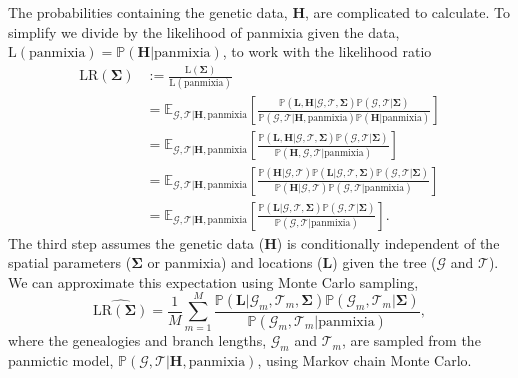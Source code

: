 \documentclass[12pt]{article}
\begin{document}
The probabilities containing the genetic data, $\mathbf{H}$, are complicated to calculate. 
To simplify we divide by the likelihood of panmixia given the data, $\mathrm{L}(\mathrm{panmixia}) = \mathbb{P}(\mathbf{H}|\mathrm{panmixia})$, to work with the likelihood ratio
%
\begin{equation}
\begin{aligned}
\mathrm{LR}(\mathbf{\Sigma}) &:= \frac{\mathrm{L}(\mathbf{\Sigma})}{\mathrm{L}(\mathrm{panmixia})}\\
&= \mathbb{E}_{\mathcal{G}, \mathcal{T} | \mathbf{H}, \mathrm{panmixia}} \left[ \frac{\mathbb{P}(\mathbf{L}, \mathbf{H} | \mathcal{G}, \mathcal{T},\mathbf{\Sigma}) \mathbb{P}(\mathcal{G}, \mathcal{T} | \mathbf{\Sigma})}{\mathbb{P}(\mathcal{G}, \mathcal{T} | \mathbf{H}, \mathrm{panmixia}) \mathbb{P}(\mathbf{H} | \mathrm{panmixia})} \right] \\
&= \mathbb{E}_{\mathcal{G}, \mathcal{T} | \mathbf{H}, \mathrm{panmixia}} \left[ \frac{\mathbb{P}(\mathbf{L},\mathbf{H} | \mathcal{G}, \mathcal{T},\mathbf{\Sigma}) \mathbb{P}(\mathcal{G}, \mathcal{T} | \mathbf{\Sigma})}{\mathbb{P}(\mathbf{H}, \mathcal{G}, \mathcal{T} | \mathrm{panmixia})} \right] \\
&= \mathbb{E}_{\mathcal{G}, \mathcal{T} | \mathbf{H}, \mathrm{panmixia}} \left[ \frac{\mathbb{P}(\mathbf{H} | \mathcal{G}, \mathcal{T}) \mathbb{P}(\mathbf{L} | \mathcal{G}, \mathcal{T},\mathbf{\Sigma}) \mathbb{P}(\mathcal{G}, \mathcal{T} | \mathbf{\Sigma})}{\mathbb{P}(\mathbf{H} | \mathcal{G},\mathcal{T})\mathbb{P}(\mathcal{G}, \mathcal{T} | \mathrm{panmixia})} \right] \\
&= \mathbb{E}_{\mathcal{G}, \mathcal{T} | \mathbf{H}, \mathrm{panmixia}} \left[ \frac{ \mathbb{P}(\mathbf{L} | \mathcal{G}, \mathcal{T}, \mathbf{\Sigma}) \mathbb{P}(\mathcal{G}, \mathcal{T} | \mathbf{\Sigma})}{\mathbb{P}(\mathcal{G}, \mathcal{T} | \mathrm{panmixia})} \right].
\end{aligned}
\end{equation}
%
The third step assumes the genetic data ($\mathbf{H}$) is conditionally independent of the spatial parameters ($\mathbf{\Sigma}$ or panmixia) and locations ($\mathbf{L}$) given the tree ($\mathcal{G}$ and $\mathcal{T}$).
We can approximate this expectation using Monte Carlo sampling,
%
\begin{equation}\label{eq:LRmontecarlo1}
\widehat{\mathrm{LR}(\mathbf{\Sigma})} = \frac{1}{M} \sum_{m=1}^{M} \frac{ \mathbb{P}(\mathbf{L} | \mathcal{G}_m, \mathcal{T}_m, \mathbf{\Sigma}) \mathbb{P}(\mathcal{G}_m, \mathcal{T}_m | \mathbf{\Sigma})}{\mathbb{P}(\mathcal{G}_m, \mathcal{T}_m | \mathrm{panmixia})},
\end{equation}
%
where the genealogies and branch lengths, $\mathcal{G}_m$ and $\mathcal{T}_m$, are sampled from the panmictic model, $\mathbb{P}(\mathcal{G}, \mathcal{T} | \mathbf{H}, \mathrm{panmixia})$, using Markov chain Monte Carlo.
\end{document}
